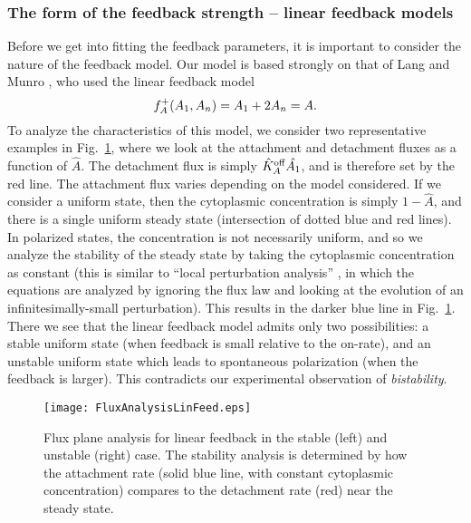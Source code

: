 \documentclass[11pt]{article}
\newcommand{\6}[1]{#1_{\text{6}}}
\newcommand{\3}[1]{#1_{\text{3}}}
\begin{document}
\subsubsection{The form of the feedback strength -- linear feedback models}
Before we get into fitting the feedback parameters, it is important to consider the nature of the feedback model. Our model is based strongly on that of Lang and Munro \cite{lang2022oligomerization}, who used the linear feedback model $$f_A^+(A_1,A_n)=A_1+2A_n=A.$$ 
To analyze the characteristics of this model, we consider two representative examples in Fig.\ \ref{fig:P3Linear}, where we look at the attachment and detachment fluxes as a function of $\hat A$. The detachment flux is simply $\hat{K}^\text{off}_A \hat {A_1}$, and is therefore set by the red line. The attachment flux varies depending on the model considered. If we consider a uniform state, then the cytoplasmic concentration is simply $1-\hat A$, and there is a single uniform steady state (intersection of dotted blue and red lines). In polarized states, the concentration is not necessarily uniform, and so we analyze the stability of the steady state by taking the cytoplasmic concentration as constant (this is similar to ``local perturbation analysis'' \cite{holmes2015local}, in which the equations are analyzed by ignoring the flux law and looking at the evolution of an infinitesimally-small perturbation). This results in the darker blue line in Fig.\ \ref{fig:P3Linear}. There we see that the linear feedback model admits only two possibilities: a stable uniform state (when feedback is small relative to the on-rate), and an unstable uniform state which leads to spontaneous polarization (when the feedback is larger). This contradicts our experimental observation of \emph{bistability}.

\begin{figure}
\centering
\texttt{[image: FluxAnalysisLinFeed.eps]}
\caption{\label{fig:P3Linear}Flux plane analysis for linear feedback in the stable (left) and unstable (right) case. The stability analysis is determined by how the attachment rate (solid blue line, with constant cytoplasmic concentration) compares to the detachment rate (red) near the steady state.}
\end{figure}
\end{document}
